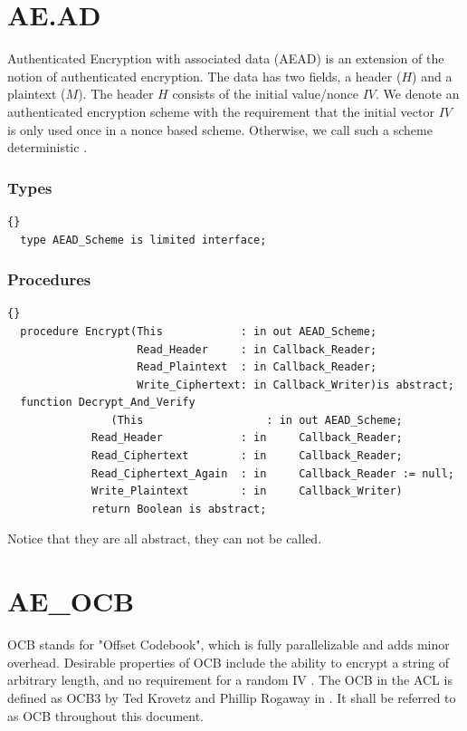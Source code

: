 
\section{AE.AD}
Authenticated Encryption with associated data (AEAD) is an extension
of the notion of authenticated encryption. The data has two fields, a
header ($H$) and a plaintext ($M$). The header $H$ consists of the
initial value/nonce $IV$. We denote an authenticated encryption scheme
with the requirement that the initial vector $IV$ is only used once in
a nonce based scheme. Otherwise, we call such a scheme deterministic
\cite{DBLP:conf/fse/FleischmannFL12}.
\subsubsection*{Types}
\begin{lstlisting}{}
  type AEAD_Scheme is limited interface;
\end{lstlisting}
\subsubsection*{Procedures}
\begin{lstlisting}{}
  procedure Encrypt(This            : in out AEAD_Scheme;
                    Read_Header     : in Callback_Reader;
                    Read_Plaintext  : in Callback_Reader;
                    Write_Ciphertext: in Callback_Writer)is abstract;
  function Decrypt_And_Verify
  				(This                   : in out AEAD_Scheme;
             Read_Header            : in     Callback_Reader;
             Read_Ciphertext        : in     Callback_Reader;
             Read_Ciphertext_Again  : in     Callback_Reader := null;
             Write_Plaintext        : in     Callback_Writer)
             return Boolean is abstract;
\end{lstlisting}
Notice that they are all abstract, they can not be called.\\


\section{AE\_OCB}
OCB stands for "Offset Codebook", which is fully parallelizable and
adds minor overhead. Desirable properties of OCB include the ability
to encrypt a string of arbitrary length, and no requirement for a
random IV \cite{DBLP:journals/tissec/RogawayBB03}. The OCB in the ACL
is defined as OCB3 by Ted Krovetz and Phillip Rogaway in
\cite{DBLP:conf/fse/KrovetzR11}. It shall be referred to as OCB
throughout this document.

